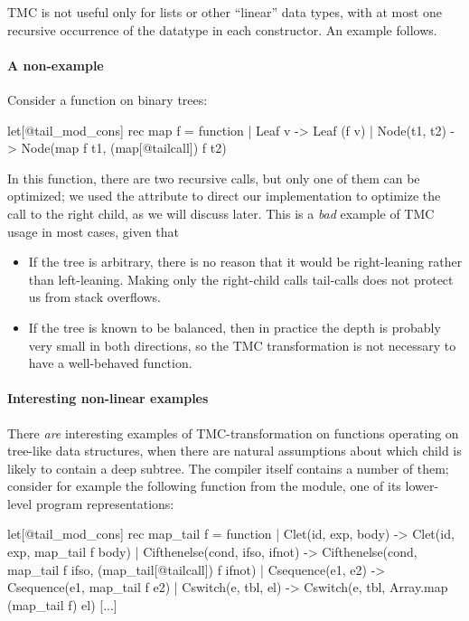 TMC is not useful only for lists or other ``linear'' data types, with
at most one recursive occurrence of the datatype in each
constructor. An example follows.

\paragraph{A non-example} Consider a  function on binary
trees:
\begin{Ocaml}
let[@tail_mod_cons] rec map f = function
| Leaf v -> Leaf (f v)
| Node(t1, t2) -> Node(map f t1, (map[@tailcall]) f t2)
\end{Ocaml}
In this function, there are two recursive calls, but only one of them
can be optimized; we used the \ocaml{[@tailcall]} attribute to direct
our implementation to optimize the call to the right child, as we will
discuss later. This is a \emph{bad} example of TMC usage in most
cases, given that
\begin{itemize}
\item If the tree is arbitrary, there is no reason that it would be
  right-leaning rather than left-leaning. Making only the right-child
  calls tail-calls does not protect us from stack overflows.
\item If the tree is known to be balanced, then in practice the depth
  is probably very small in both directions, so the TMC transformation
  is not necessary to have a well-behaved function.
\end{itemize}

\paragraph{Interesting non-linear examples} There \emph{are} interesting
examples of TMC-transformation on functions operating on tree-like
data structures, when there are natural assumptions about which child
is likely to contain a deep subtree. The \OCaml compiler itself
contains a number of them; consider for example the following function
from the  module, one of its lower-level program
representations:

\begin{Ocaml}
let[@tail_mod_cons] rec map_tail f = function
  | Clet(id, exp, body) ->
      Clet(id, exp, map_tail f body)
  | Cifthenelse(cond, ifso, ifnot) ->
      Cifthenelse(cond, map_tail f ifso, (map_tail[@tailcall]) f ifnot)
  | Csequence(e1, e2) ->
      Csequence(e1, map_tail f e2)
  | Cswitch(e, tbl, el) ->
      Cswitch(e, tbl, Array.map (map_tail f) el)
  [...]
\end{Ocaml}

